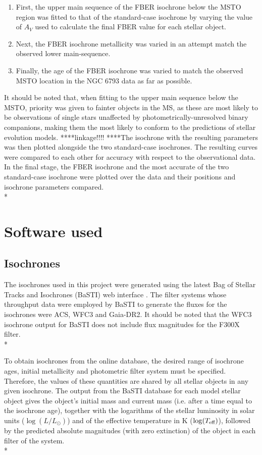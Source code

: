 \documentclass[12pt, a4paper]{report}
\begin{document}
\begin{enumerate}
\item First, the upper main sequence of the FBER isochrone below the MSTO region was fitted to that of the standard-case isochrone by varying the value of $A_{V}$ used to calculate the final FBER value for each stellar object.
\item Next, the FBER isochrone metallicity was varied in an attempt match the observed lower main-sequence.
\item Finally, the age of the FBER isochrone was varied to match the observed MSTO location in the NGC 6793 data as far as possible.
\end{enumerate}

It should be noted that, when fitting  to the upper main sequence below the MSTO, priority was given to fainter objects in the MS, as these are most likely to be observations of single stars unaffected by photometrically-unresolved binary companions, making them the most likely to conform to the predictions of stellar evolution models.
****linkage!!!!
****The isochrone with the resulting parameters was then plotted alongside the two standard-case isochrones. The resulting curves were compared to each other for accuracy with respect to the observational data. In the final stage, the FBER isochrone and the most accurate of the two standard-case isochrone were plotted over the data and their positions and isochrone parameters compared.\\* 


\section{Software used}
\subsection{Isochrones}
The isochrones used in this project were generated using the latest Bag of Stellar Tracks and Isochrones (BaSTI) web interface \citep{2004ApJ...612..168P,2018ApJ...856..125H}. The filter systems whose throughput data were employed by BaSTI to generate the fluxes for the isochrones were ACS, WFC3 and Gaia-DR2. It should be noted that the WFC3 isochrone output for BaSTI does not include flux magnitudes for the F300X filter.\\*

To obtain isochrones from the online database, the desired range of isochrone ages, initial metallicity and photometric filter system must be specified. Therefore, the values of these quantities are shared by all stellar objects in any given isochrone. The output from the BaSTI database for each model stellar object gives the object's initial mass and current mass (i.e. after a time equal to the isochrone age), together with the logarithms of the stellar luminosity in solar units ($\log(L/L_{\odot})$) and of the effective temperature in K ($\log(T_{\textnormal{eff}})$), followed by the predicted absolute magnitudes (with zero extinction) of the object in each filter of the system. \\*
\end{document}
